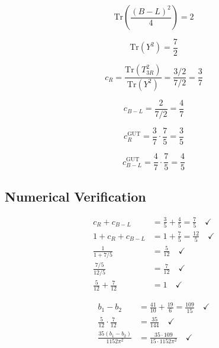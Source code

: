 \documentclass[11pt,a4paper]{article}
\theoremstyle{definition}
\begin{document}
\begin{equation}
\label{eq:trace_ext_4}
\text{Tr}\left(\frac{(B-L)^2}{4}\right) = 2
\end{equation}

\begin{equation}
\label{eq:trace_ext_5}
\text{Tr}(Y^2) = \frac{7}{2}
\end{equation}

\begin{equation}
\label{eq:trace_ext_6}
c_R = \frac{\text{Tr}(T_{3R}^2)}{\text{Tr}(Y^2)} = \frac{3/2}{7/2} = \frac{3}{7}
\end{equation}

\begin{equation}
\label{eq:trace_ext_7}
c_{B-L} = \frac{2}{7/2} = \frac{4}{7}
\end{equation}

\begin{equation}
\label{eq:trace_ext_8}
c_R^{\text{GUT}} = \frac{3}{7} \cdot \frac{7}{5} = \frac{3}{5}
\end{equation}

\begin{equation}
\label{eq:trace_ext_9}
c_{B-L}^{\text{GUT}} = \frac{4}{7} \cdot \frac{7}{5} = \frac{4}{5}
\end{equation}

\subsection{Numerical Verification}
\label{subsec:num_extended}

\begin{align}
\label{eq:num_ext_1}
c_R + c_{B-L} &= \frac{3}{5} + \frac{4}{5} = \frac{7}{5} \quad \checkmark \\
\label{eq:num_ext_2}
1 + c_R + c_{B-L} &= 1 + \frac{7}{5} = \frac{12}{5} \quad \checkmark \\
\label{eq:num_ext_3}
\frac{1}{1 + 7/5} &= \frac{5}{12} \quad \checkmark \\
\label{eq:num_ext_4}
\frac{7/5}{12/5} &= \frac{7}{12} \quad \checkmark \\
\label{eq:num_ext_5}
\frac{5}{12} + \frac{7}{12} &= 1 \quad \checkmark
\end{align}

\begin{align}
\label{eq:num_ext_6}
b_1 - b_2 &= \frac{41}{10} + \frac{19}{6} = \frac{109}{15} \quad \checkmark \\
\label{eq:num_ext_7}
\frac{5}{12} \cdot \frac{7}{12} &= \frac{35}{144} \quad \checkmark \\
\label{eq:num_ext_8}
\frac{35(b_1-b_2)}{1152\pi^2} &= \frac{35 \cdot 109}{15 \cdot 1152\pi^2} \quad \checkmark
\end{align}
\end{document}
